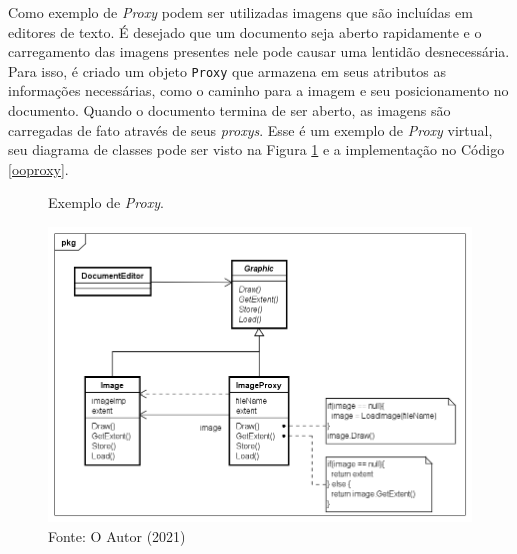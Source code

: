Como exemplo de \textit{Proxy} podem ser utilizadas 
imagens que são incluídas em editores de 
texto. É desejado que um documento seja aberto 
rapidamente e o carregamento das imagens 
presentes nele pode causar uma lentidão 
desnecessária. Para isso, é criado um objeto 
\texttt{Proxy} que armazena em seus atributos as 
informações necessárias, como o caminho 
para a imagem e seu posicionamento no 
documento. Quando o documento termina de 
ser aberto, as imagens são carregadas de 
fato através de seus \textit{proxys}. Esse é um 
exemplo de \textit{Proxy} virtual, seu diagrama de 
classes pode ser visto na Figura \ref{proxy_exemplo} 
e a implementação no Código \ref{ooproxy}.

\begin{figure}[htb]
	\caption{\label{proxy_exemplo}Exemplo de \textit{Proxy}.}
	\begin{center}
	    \includegraphics[scale=0.5]{5_padroes-contexto-funcional/5.2_estruturais/5.2.7_proxy/proxy_exemplo.png}
	\end{center}
  \caption*{Fonte: O Autor (2021)}
\end{figure}

